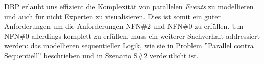 \ac{DBP} erlaubt uns effizient die Komplexität von parallelen \textit{Events} zu modellieren und auch für nicht Experten zu visualisieren. Dies ist somit ein guter Anforderungen um die Anforderungen NFN\#2 und NFN\#0 zu erfüllen. Um NFN\#0 allerdings komplett zu erfüllen, muss ein weiterer Sachverhalt addressiert werden: das modellieren sequentieller Logik, wie sie in Problem ''Parallel contra Sequentiell'' beschrieben und in Szenario S\#2 verdeutlicht ist.